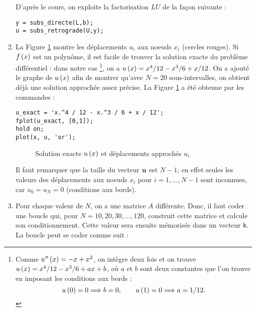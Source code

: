 \begin{enumerate}[label=\alph*)]
        D'après le cours, on exploite la factorisation $LU$ de la façon suivante :
        
\begin{verbatim}
y = subs_directe(L,b);
u = subs_retrograde(U,y);
\end{verbatim}
        
  \item La Figure \ref{fig:solExacte} montre les déplacements $u_{i}$ aux noeuds $x_{i}$ (cercles rouges).
        Si $f \left(x\right)$ est un polynôme, il est facile de trouver la solution exacte du problème différentiel : dans notre cas \footnote{Comme $u'' \left(x\right) = - x + x^{2}$,
        on intègre deux fois et on trouve $u \left(x\right) = x^{4} / 12 - x^{3} / 6 + a x + b$, où $a$ et $b$ sont deux constantes que l'on trouve en imposant les conditions aux bords :
          \begin{equation*}
            u \left(0\right) = 0 \Longrightarrow b = 0, 
            \quad \quad
            u \left(1\right) = 0 \Longrightarrow a = 1/12.
          \end{equation*}},
        on a $u \left(x\right) = x^{4} / 12 - x^{3} / 6 + x / 12$.
        On a ajouté le graphe de $u \left(x\right)$ afin de montrer qu'avec $N = 20$ sous-intervalles, on obtient déjà une solution approchée assez précise.
        La Figure \ref{fig:solExacte} a été obtenue par les commandes :
        
\begin{verbatim}
u_exact = 'x.^4 / 12 - x.^3 / 6 + x / 12';
fplot(u_exact, [0,1]);
hold on;  
plot(x, u, 'or');
\end{verbatim}
        
\begin{figure}[h!]
  \centering
  \caption{Solution exacte $u \left(x\right)$ et déplacements approchés $u_{i}$}
  \label{fig:solExacte}
\end{figure}

        Il faut remarquer que la taille du vecteur $\mathbf{u}$ est $N - 1$; en effet seules les valeurs des déplacements aux noeuds $x_{i}$ pour $i = 1, \dots, N - 1$ sont inconnues, car $u_{0} = u_{N} = 0$ (conditions aux bords).
        
  
  \item Pour chaque valeur de $N$, on a une matrice $A$ différente.
        Donc, il faut coder une boucle qui, pour $N = 10, 20, 30, \dots, 120$, construit cette matrice et calcule son conditionnement.
        Cette valeur sera ensuite mémorisée dans un vecteur \texttt{k}.
        La boucle peut se coder comme suit : 
        

\end{enumerate}
